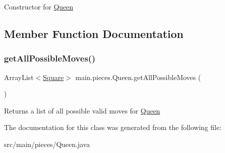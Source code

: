 Constructor for \hyperlink{classmain_1_1pieces_1_1_queen}{Queen} 

\subsection{Member Function Documentation}
\mbox{\label{classmain_1_1pieces_1_1_queen_ab262350e8d1ea40a4b3191724790051b}} 
\subsubsection{\texorpdfstring{get\+All\+Possible\+Moves()}{getAllPossibleMoves()}}
{\footnotesize\ttfamily Array\+List$<$\hyperlink{classmain_1_1_square}{Square}$>$ main.\+pieces.\+Queen.\+get\+All\+Possible\+Moves (\begin{DoxyParamCaption}{ }\end{DoxyParamCaption})\hspace{0.3cm}{\ttfamily [inline]}}

Returns a list of all possible valid moves for \hyperlink{classmain_1_1pieces_1_1_queen}{Queen} 

The documentation for this class was generated from the following file\+:\begin{DoxyCompactItemize}
\item 
src/main/pieces/Queen.\+java\end{DoxyCompactItemize}
